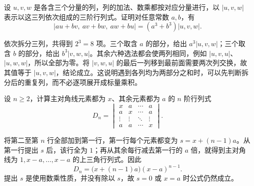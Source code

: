 \begin{example}
设 $u,v,w$ 是各含三个分量的列，列的加法、数乘都按对应分量进行，以 $|u,v,w|$ 表示以这三列依次组成的三阶行列式。证明对任意常数 $a,b$，有
\[
    |au+bv,\ av+bw,\ aw+bu|=(a^3+b^3)|u,v,w|.
\]
\end{example}
\begin{solve}
依次拆分三列，共得到 $2^3=8$ 项。三个取含 $a$ 的部分，给出 $a^3|u,v,w|$；三个取含 $b$ 的部分，给出 $b^3|v,w,u|$。其余六种选法都会使两列相同，例如 $|u,v,u|$、$|u,w,w|$，所以全部为零。将 $|v,w,u|$ 的最后一列移到最前面需要两次列交换，故其值等于 $|u,v,w|$，结论成立。这说明遇到各列均为两部分之和时，可以先判断拆分后的重复列，而不必逐项展开成标量乘积。
\end{solve}

\begin{example}
\label{ex:determinant-constant-off-diagonal}
设 $n\geq2$，计算主对角线元素都为 $x$、其余元素都为 $a$ 的 $n$ 阶行列式
\[
    D_n=\begin{vmatrix}
        x&a&\cdots&a\\
        a&x&\cdots&a\\
        \vdots&\vdots&\ddots&\vdots\\
        a&a&\cdots&x
    \end{vmatrix}.
\]
\end{example}
\begin{solve}
将第二至第 $n$ 行全部加到第一行，第一行每个元素都变为 $s=x+(n-1)a$。从第一行提出 $s$ 后，该行全为 $1$；再从其余每行减去第一行的 $a$ 倍，就得到主对角线为 $1,x-a,\ldots,x-a$ 的上三角行列式。因此
\begin{equation}
\label{eq:determinant-constant-off-diagonal}
    D_n=\bigl(x+(n-1)a\bigr)(x-a)^{n-1}.
\end{equation}
提出 $s$ 是使用数乘性质，并没有除以 $s$，故 $s=0$ 或 $x=a$ 时公式仍然成立。
\end{solve}

